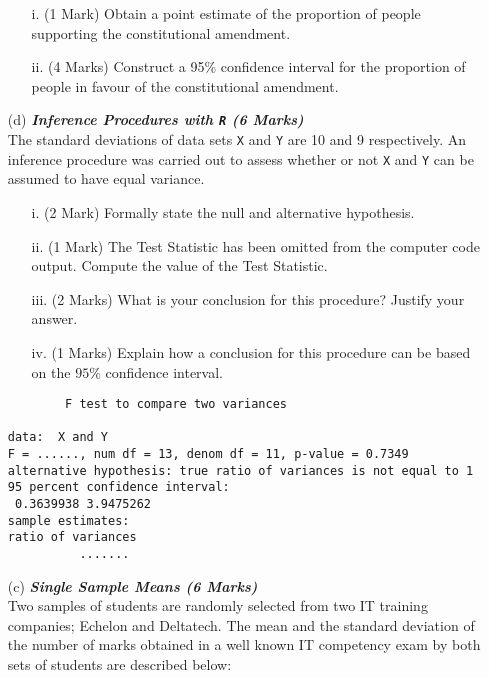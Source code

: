 \documentclass[]{article}
\begin{document}
\begin{itemize}
\begin{itemize}
\item [i.](1 Mark) Obtain a point estimate of the proportion of people supporting the constitutional amendment.
\item [ii.](4 Marks) Construct a 95\% confidence interval for the proportion of people in favour of the constitutional amendment.
\end{itemize}

\item[(d)] \textbf{\textit{Inference Procedures with \texttt{R} (6 Marks)}}\\
The standard deviations of data sets \texttt{X} and \texttt{Y} are 10 and 9 respectively. An inference procedure was carried out to assess whether or not \texttt{X} and \texttt{Y} can be assumed to have equal variance.
\begin{itemize}
\item[i.](2 Mark) Formally state the null and alternative hypothesis.
\item[ii.](1 Mark) The Test Statistic has been omitted from the computer code output. Compute the value of the Test Statistic.
\item[iii.](2 Marks) What is your conclusion for this procedure? Justify your answer.
\item[iv.] (1 Marks) Explain how a conclusion for this procedure can be based on the $95\%$ confidence interval.
\end{itemize}

\begin{framed}
\begin{verbatim}
        F test to compare two variances

data:  X and Y
F = ......, num df = 13, denom df = 11, p-value = 0.7349
alternative hypothesis: true ratio of variances is not equal to 1
95 percent confidence interval:
 0.3639938 3.9475262
sample estimates:
ratio of variances
          .......
\end{verbatim}
\end{framed}

\item[(c)] \textbf{\textit{Single Sample Means (6 Marks)}}\\
Two samples of students are randomly selected from two IT training companies; Echelon and Deltatech. The mean and the standard deviation of the number of marks obtained in a well known IT competency exam by both sets of students are described below:\\


\end{itemize}
\end{document}
